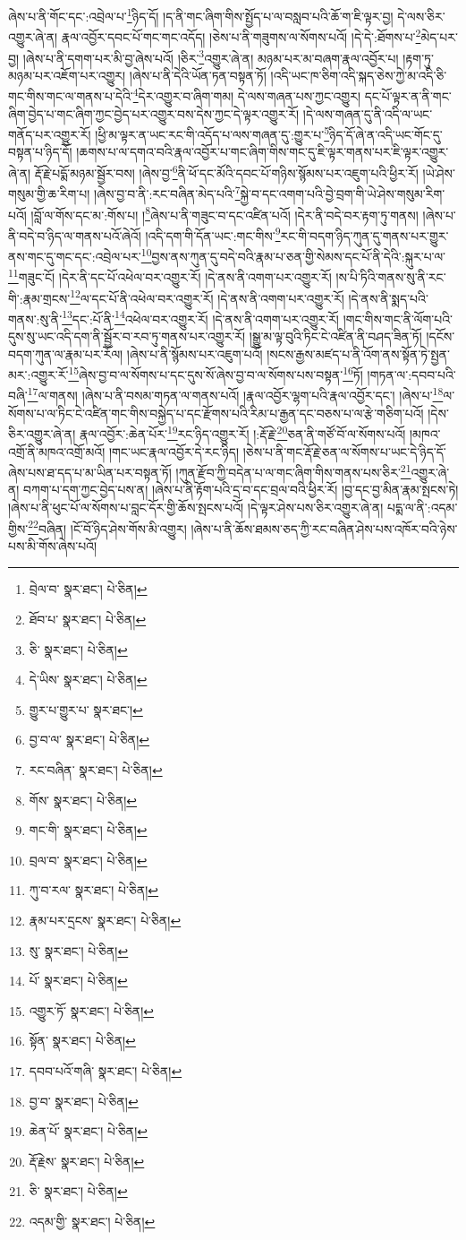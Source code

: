 ཞེས་པ་ནི་གོང་དང་:འབྲེལ་པ་\footnote{བྲེལ་བ་  སྣར་ཐང་།  པེ་ཅིན། }ཉིད་དོ། །ད་ནི་གང་ཞིག་གིས་སྤྱོད་པ་ལ་བསླབ་པའི་ཆོ་ག་ཇི་ལྟར་བྱ། དེ་ལས་ཅིར་འགྱུར་ཞེ་ན། རྣལ་འབྱོར་དབང་པོ་གང་གང་འདོད། །ཅེས་པ་ནི་གཟུགས་ལ་སོགས་པའོ། །དེ་དེ་:ཐོགས་པ་\footnote{ཐོབ་པ་  སྣར་ཐང་།  པེ་ཅིན། }མེད་པར་བྱ། །ཞེས་པ་ནི་དགག་པར་མི་བྱ་ཞེས་པའོ། །ཅིར་\footnote{ཅི་  སྣར་ཐང་།  པེ་ཅིན། }འགྱུར་ཞེ་ན། མཉམ་པར་མ་བཞག་རྣལ་འབྱོར་པ། །རྟག་ཏུ་མཉམ་པར་འཇོག་པར་འགྱུར། །ཞེས་པ་ནི་དེའི་ཡོན་ཏན་བསྟན་ཏོ། །འདི་ཡང་ཁ་ཅིག་འདི་སྐད་ཅེས་ཀྱེ་མ་འདི་ཅི་གང་གིས་གང་ལ་གནས་པ་དེའི་\footnote{དེ་ཡིས་  སྣར་ཐང་།  པེ་ཅིན། }དེར་འགྱུར་བ་ཞིག་གམ། དེ་ལས་གཞན་པས་ཀྱང་འགྱུར། དང་པོ་ལྟར་ན་ནི་གང་ཞིག་བྱེད་པ་གང་ཞིག་ཀྱང་བྱེད་པར་འགྱུར་བས་དེས་ཀྱང་དེ་ལྟར་འགྱུར་རོ། །དེ་ལས་གཞན་དུ་ནི་འདི་ལ་ཡང་གནོད་པར་འགྱུར་རོ། །ཕྱི་མ་ལྟར་ན་ཡང་རང་གི་འདོད་པ་ལས་གཞན་དུ་:གྱུར་པ་\footnote{གྱུར་པ་གྱུར་པ་  སྣར་ཐང་། }ཉིད་དོ་ཞེ་ན་འདི་ཡང་གོང་དུ་བསྟན་པ་ཉིད་དོ། །ཆགས་པ་ལ་དགའ་བའི་རྣལ་འབྱོར་པ་གང་ཞིག་གིས་གང་དུ་ཇི་ལྟར་གནས་པར་ཇི་ལྟར་འགྱུར་ཞེ་ན། རྡོ་རྗེ་པདྨོ་མཉམ་སྦྱོར་བས། །ཞེས་བྱ་\footnote{བྱ་བ་ལ་  སྣར་ཐང་།  པེ་ཅིན། }ནི་ཕོ་དང་མོའི་དབང་པོ་གཉིས་སྙོམས་པར་འཇུག་པའི་ཕྱིར་རོ། །ཡེ་ཤེས་གསུམ་གྱི་ཆ་རིག་པ། །ཞེས་བྱ་བ་ནི་:རང་བཞིན་མེད་པའི་\footnote{རང་བཞིན་  སྣར་ཐང་།  པེ་ཅིན། }སྐྱེ་བ་དང་འགག་པའི་བྱེ་བྲག་གི་ཡེ་ཤེས་གསུམ་རིག་པའོ། །བློ་ལ་གོས་དང་མ་:གོས་པ། །\footnote{གོས་  སྣར་ཐང་།  པེ་ཅིན། }ཞེས་པ་ནི་གཟུང་བ་དང་འཛིན་པའོ། །དེར་ནི་བདེ་བར་རྟག་ཏུ་གནས། །ཞེས་པ་ནི་བདེ་བ་ཉིད་ལ་གནས་པའོ་ཞེའོ། །འདི་དག་གི་དོན་ཡང་:གང་གིས་\footnote{གང་གི་  སྣར་ཐང་།  པེ་ཅིན། }རང་གི་བདག་ཉིད་ཀུན་དུ་གནས་པར་གྱུར་ནས་གང་དུ་གང་དང་:འབྲེལ་པར་\footnote{བྲལ་བ་  སྣར་ཐང་།  པེ་ཅིན། }བྱས་ནས་ཀུན་དུ་བདེ་བའི་རྣམ་པ་ཅན་གྱི་སེམས་དང་པོ་ནི་དེའི་:སྐུར་པ་ལ་\footnote{ཀུ་བ་རལ་  སྣར་ཐང་།  པེ་ཅིན། }གཟུང་ངོ། །དེར་ནི་དང་པོ་འཕེལ་བར་འགྱུར་རོ། །དེ་ནས་ནི་འགག་པར་འགྱུར་རོ། །ས་པི་ཏིའི་གནས་སུ་ནི་རང་གི་:རྣམ་གྲངས་\footnote{རྣམ་པར་དྲངས་  སྣར་ཐང་།  པེ་ཅིན། }ལ་དང་པོ་ནི་འཕེལ་བར་འགྱུར་རོ། །དེ་ནས་ནི་འགག་པར་འགྱུར་རོ། །དེ་ནས་ནི་སྨད་པའི་གནས་:སུ་ནི་\footnote{སུ་  སྣར་ཐང་།  པེ་ཅིན། }དང་:པོ་ནི་\footnote{པོ་  སྣར་ཐང་།  པེ་ཅིན། }འཕེལ་བར་འགྱུར་རོ། །དེ་ནས་ནི་འགག་པར་འགྱུར་རོ། །གང་གིས་གང་ནི་ལོག་པའི་དུས་སུ་ཡང་འདི་དག་ནི་སྦྱོར་བ་རབ་ཏུ་གནས་པར་འགྱུར་རོ། །སྒྱུ་མ་ལྟ་བུའི་ཏིང་ངེ་འཛིན་ནི་བཤད་ཟིན་ཏོ། །དངོས་བདག་ཀུན་ལ་རྣམ་པར་རོལ། །ཞེས་པ་ནི་སྙོམས་པར་འཇུག་པའོ། །སངས་རྒྱས་མཛད་པ་ནི་འོག་ནས་སྟོན་ཏེ་སྤྱན་མར་:འགྱུར་རོ་\footnote{འགྱུར་ཏོ་  སྣར་ཐང་།  པེ་ཅིན། }ཞེས་བྱ་བ་ལ་སོགས་པ་དང་དུས་སོ་ཞེས་བྱ་བ་ལ་སོགས་པས་བསྟན་\footnote{སྟོན་  སྣར་ཐང་།  པེ་ཅིན། }ཏོ། །གཏན་ལ་:དབབ་པའི་བཞི་\footnote{དབབ་པའོ་གཞི་  སྣར་ཐང་།  པེ་ཅིན། }ལ་གནས། །ཞེས་པ་ནི་བསམ་གཏན་ལ་གནས་པའོ། །རྣལ་འབྱོར་ལྷག་པའི་རྣལ་འབྱོར་དང་། །ཞེས་པ་\footnote{བྱ་བ་  སྣར་ཐང་།  པེ་ཅིན། }ལ་སོགས་པ་ལ་ཏིང་ངེ་འཛིན་གང་གིས་བསྐྱེད་པ་དང་རྫོགས་པའི་རིམ་པ་རྒྱན་དང་བཅས་པ་ལ་རྩེ་གཅིག་པའོ། །དེས་ཅིར་འགྱུར་ཞེ་ན། རྣལ་འབྱོར་:ཆེན་པོར་\footnote{ཆེན་པོ་  སྣར་ཐང་།  པེ་ཅིན། }རང་ཉིད་འགྱུར་རོ། །:རྡོ་རྗེ་\footnote{རྡོ་རྗེས་  སྣར་ཐང་།  པེ་ཅིན། }ཅན་ནི་གཙོ་བོ་ལ་སོགས་པའོ། །མཁའ་འགྲོ་ནི་མཁའ་འགྲོ་མའོ། །གང་ཡང་རྣལ་འབྱོར་དེ་རང་ཉིད། །ཅེས་པ་ནི་གང་རྡོ་རྗེ་ཅན་ལ་སོགས་པ་ཡང་དེ་ཉིད་དོ་ཞེས་པས་ཐ་དད་པ་མ་ཡིན་པར་བསྟན་ཏོ། །ཀུན་རྫོབ་ཀྱི་བདེན་པ་ལ་གང་ཞིག་གིས་གནས་པས་ཅིར་\footnote{ཅི་  སྣར་ཐང་།  པེ་ཅིན། }འགྱུར་ཞེ་ན། བཀག་པ་དག་ཀྱང་བྱེད་པས་ན། །ཞེས་པ་ནི་རྟོག་པའི་དྲ་བ་དང་བྲལ་བའི་ཕྱིར་རོ། །བྱ་དང་བྱ་མིན་རྣམ་སྤངས་ཏེ། །ཞེས་པ་ནི་ཕུང་པོ་ལ་སོགས་པ་བླང་དོར་གྱི་ཆོས་སྤངས་པའོ། །དེ་ལྟར་ཤེས་པས་ཅིར་འགྱུར་ཞེ་ན། པདྨ་ལ་ནི་:འདམ་གྱིས་\footnote{འདམ་གྱི་  སྣར་ཐང་།  པེ་ཅིན། }བཞིན། །ངོ་བོ་ཉིད་ཤེས་གོས་མི་འགྱུར། །ཞེས་པ་ནི་ཆོས་ཐམས་ཅད་ཀྱི་རང་བཞིན་ཤེས་པས་འཁོར་བའི་ཉེས་པས་མི་གོས་ཞེས་པའོ། 
